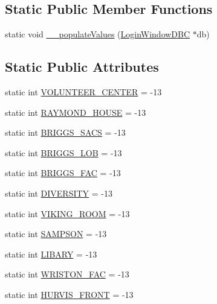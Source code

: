 \subsection*{Static Public Member Functions}
\begin{DoxyCompactItemize}
\item 
static void \hyperlink{class_location_def_a9315c8e82c35f5879d9a1c7eac3e4bed}{\+\_\+\+\_\+populate\+Values} (\hyperlink{class_login_window_d_b_c}{Login\+Window\+D\+B\+C} $\ast$db)
\end{DoxyCompactItemize}
\subsection*{Static Public Attributes}
\begin{DoxyCompactItemize}
\item 
static int \hyperlink{class_location_def_a850be3e1cad156a31d265aadd087be40}{V\+O\+L\+U\+N\+T\+E\+E\+R\+\_\+\+C\+E\+N\+T\+E\+R} = -\/13
\item 
static int \hyperlink{class_location_def_a5f26fce0939a4cb322b81c96248f0bad}{R\+A\+Y\+M\+O\+N\+D\+\_\+\+H\+O\+U\+S\+E} = -\/13
\item 
static int \hyperlink{class_location_def_af5e53ceb9fabbd5dfa36ee18edb75c80}{B\+R\+I\+G\+G\+S\+\_\+\+S\+A\+C\+S} = -\/13
\item 
static int \hyperlink{class_location_def_a514d58075368a17b09bdb179786002df}{B\+R\+I\+G\+G\+S\+\_\+\+L\+O\+B} = -\/13
\item 
static int \hyperlink{class_location_def_a707f0b4b5fa47109e1484118cac660be}{B\+R\+I\+G\+G\+S\+\_\+\+F\+A\+C} = -\/13
\item 
static int \hyperlink{class_location_def_a726490487b980ef7ca60b13770faa32b}{D\+I\+V\+E\+R\+S\+I\+T\+Y} = -\/13
\item 
static int \hyperlink{class_location_def_a741d34ce8dc7c1e94978aee6965b2854}{V\+I\+K\+I\+N\+G\+\_\+\+R\+O\+O\+M} = -\/13
\item 
static int \hyperlink{class_location_def_a523a7cc1f690bb8dc18dbeb3dcb3b373}{S\+A\+M\+P\+S\+O\+N} = -\/13
\item 
static int \hyperlink{class_location_def_a1f051809583d59b96df3117f876984ea}{L\+I\+B\+A\+R\+Y} = -\/13
\item 
static int \hyperlink{class_location_def_aacd6614860bbb45c15b17bc57c93bffa}{W\+R\+I\+S\+T\+O\+N\+\_\+\+F\+A\+C} = -\/13
\item 
static int \hyperlink{class_location_def_a7bd900e85552681278c8af3b2b67c5a6}{H\+U\+R\+V\+I\+S\+\_\+\+F\+R\+O\+N\+T} = -\/13

\end{DoxyCompactItemize}
